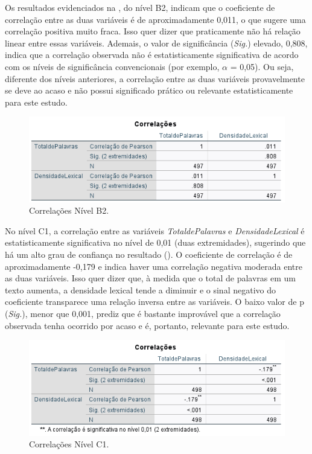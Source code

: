 \documentclass[portuguese]{textolivre}
\begin{document}
Os resultados evidenciados na , do nível B2, indicam que o coeficiente de correlação entre as duas variáveis é de aproximadamente 0,011, o que sugere uma correlação positiva muito fraca. Isso quer dizer que praticamente não há relação linear entre essas variáveis. Ademais, o valor de significância (\textit{Sig.}) elevado, 0,808, indica que a correlação observada não é estatisticamente significativa de acordo com os níveis de significância convencionais (por exemplo, $\alpha$ = 0,05). Ou seja, diferente dos níveis anteriores, a correlação entre as duas variáveis provavelmente se deve ao acaso e não possui significado prático ou relevante estatisticamente para este estudo.

\begin{figure}[h!]
    \centering
    \includegraphics[width=0.8\linewidth]{Fig13.png}
    \caption{Correlações Nível B2.}
    \label{fig13}
\end{figure}

No nível C1, a correlação entre as variáveis \textit{TotaldePalavras} e \textit{DensidadeLexical} é estatisticamente significativa no nível de 0,01 (duas extremidades), sugerindo que há um alto grau de confiança no resultado (). O coeficiente de correlação é de aproximadamente -0,179 e indica haver uma correlação negativa moderada entre as duas variáveis. Isso quer dizer que, à medida que o total de palavras em um texto aumenta, a densidade lexical tende a diminuir e o sinal negativo do coeficiente transparece uma relação inversa entre as variáveis. O baixo valor de p (\textit{Sig.}), menor que 0,001, prediz que é bastante improvável que a correlação observada tenha ocorrido por acaso e é, portanto, relevante para este estudo.  

\begin{figure}[h!]
    \centering
    \includegraphics[width=0.8\linewidth]{Fig14.png}
    \caption{Correlações Nível C1.}
    \label{fig14}
\end{figure}
\end{document}
